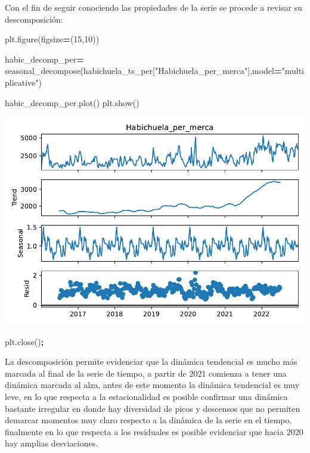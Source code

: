 \documentclass[
]{book}
\newenvironment{Shaded}{\begin{snugshade}}{\end{snugshade}}
\newcommand{\DecValTok}[1]{\textcolor[rgb]{0.00,0.00,0.81}{#1}}
\newcommand{\NormalTok}[1]{#1}
\newcommand{\OperatorTok}[1]{\textcolor[rgb]{0.81,0.36,0.00}{\textbf{#1}}}
\newcommand{\StringTok}[1]{\textcolor[rgb]{0.31,0.60,0.02}{#1}}
\begin{document}
Con el fin de seguir conociendo las propiedades de la serie se procede a revisar su descomposición:

\begin{Shaded}
\begin{Highlighting}[]


\NormalTok{plt.figure(figsize}\OperatorTok{=}\NormalTok{(}\DecValTok{15}\NormalTok{,}\DecValTok{10}\NormalTok{))}

\NormalTok{habic\_decomp\_per}\OperatorTok{=}\NormalTok{ seasonal\_decompose(habichuela\_ts\_per[}\StringTok{"Habichuela\_per\_merca"}\NormalTok{],model}\OperatorTok{=}\StringTok{"multiplicative"}\NormalTok{)}

\NormalTok{habic\_decomp\_per.plot()}
\NormalTok{plt.show()}
\end{Highlighting}
\end{Shaded}

\includegraphics{bookdown-demo_files/figure-latex/unnamed-chunk-108-91.pdf}

\begin{Shaded}
\begin{Highlighting}[]
\NormalTok{plt.close()}\OperatorTok{;}
\end{Highlighting}
\end{Shaded}

La descomposición permite evidenciar que la dinámica tendencial es mucho más marcada al final de la serie de tiempo, a partir de 2021 comienza a tener una dinámica marcada al alza, antes de este momento la dinámica tendencial es muy leve, en lo que respecta a la estacionalidad es posible confirmar una dinámica bastante irregular en donde hay diversidad de picos y descensos que no permiten demarcar momentos muy claro respecto a la dinámica de la serie en el tiempo, finalmente en lo que respecta a los residuales es posible evidenciar que hacia 2020 hay amplias desviaciones.
\end{document}
